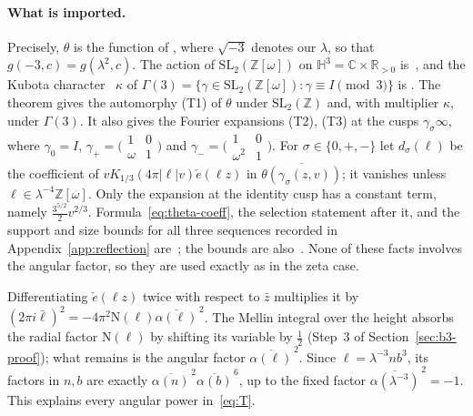 \documentclass[11pt]{article}
\numberwithin{equation}{section}
\newcommand{\OO}{\mathbb Z[\omega]}
\newcommand{\N}{\mathrm N}
\newcommand{\ce}{\check e}
\begin{document}
\paragraph{What is imported.} Precisely, $\theta$ is the function of
\cite[Theorem~23]{QF}, where $\sqrt{-3}$ denotes our $\lambda$, so that
$g(-3,c)=g(\lambda^2,c)$. The action of $\mathrm{SL}_2(\OO)$ on
$\mathbb H^3=\mathbb C\times\mathbb R_{>0}$ is~\cite[(5.1)]{QF}, and the
Kubota character~\cite{Kub69} $\kappa$ of
$\Gamma(3)=\{\gamma\in\mathrm{SL}_2(\OO):\gamma\equiv I\pmod3\}$ is
\cite[(5.4) and Theorem~22]{QF}. The theorem gives the automorphy (T1)
of $\theta$ under $\mathrm{SL}_2(\mathbb Z)$ and, with multiplier $\kappa$,
under $\Gamma(3)$. It also gives the Fourier expansions (T2), (T3) at the
cusps $\gamma_\sigma\infty$, where $\gamma_0=I$,
$\gamma_+=\bigl(\begin{smallmatrix}1&0\\\omega&1\end{smallmatrix}\bigr)$
and
$\gamma_-=\bigl(\begin{smallmatrix}1&0\\\omega^2&1\end{smallmatrix}\bigr)$.
For $\sigma\in\{0,+,-\}$ let $d_\sigma(\ell)$ be the coefficient of
$vK_{1/3}(4\pi|\ell|v)\ce(\ell z)$ in $\overline{\theta(\gamma_\sigma(z,v))}$;
it vanishes unless $\ell\in\lambda^{-4}\OO$. Only the expansion at the
identity cusp has a constant term, namely $\frac{3^{5/2}}2v^{2/3}$.
Formula~\eqref{eq:theta-coeff}, the selection statement after it, and
the support and size bounds for all three sequences recorded in
Appendix~\ref{app:reflection} are~\cite[Corollary~24]{QF}; the bounds are
also~\cite[Lemma~6.4]{OAI1112}. None of these facts involves the angular
factor, so they are used exactly as in the zeta case.

Differentiating $\ce(\ell z)$ twice with respect to $\bar z$ multiplies
it by $(2\pi i\bar\ell)^2=-4\pi^2\N(\ell)\overline{\alpha(\ell)}^{\,2}$. The Mellin integral over the
height absorbs the radial factor $\N(\ell)$ by shifting its variable by $\frac12$ (Step~3 of
Section~\ref{sec:b3-proof}); what remains is the angular factor $\overline{\alpha(\ell)}^{\,2}$.
Since $\ell=\lambda^{-3}nb^3$, its factors in $n,b$ are exactly
$\overline{\alpha(n)}^{\,2}\overline{\alpha(b)}^{\,6}$, up to the
fixed factor $\overline{\alpha(\lambda^{-3})}^{\,2}=-1$.
This explains every angular power in~\eqref{eq:T}.
\end{document}

